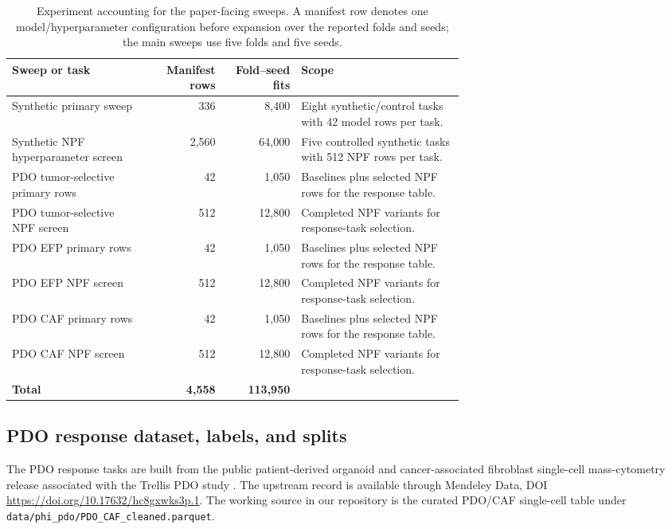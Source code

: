 \documentclass{article}
\theoremstyle{remark}
\theoremstyle{plain}
\begin{document}
\begin{table}[H]
\caption{Experiment accounting for the paper-facing sweeps. A manifest row denotes one model/hyperparameter configuration before expansion over the reported folds and seeds; the main sweeps use five folds and five seeds.}
\label{tab:experiment-accounting}
\centering
\small
\setlength{\tabcolsep}{4pt}
\renewcommand{\arraystretch}{1.12}
\begin{tabular}{p{0.30\linewidth}rrp{0.36\linewidth}}
\toprule
Sweep or task & Manifest rows & Fold--seed fits & Scope \\
\midrule
Synthetic primary sweep & 336 & 8{,}400 & Eight synthetic/control tasks with 42 model rows per task. \\
Synthetic NPF hyperparameter screen & 2{,}560 & 64{,}000 & Five controlled synthetic tasks with 512 NPF rows per task. \\
PDO tumor-selective primary rows & 42 & 1{,}050 & Baselines plus selected NPF rows for the response table. \\
PDO tumor-selective NPF screen & 512 & 12{,}800 & Completed NPF variants for response-task selection. \\
PDO EFP primary rows & 42 & 1{,}050 & Baselines plus selected NPF rows for the response table. \\
PDO EFP NPF screen & 512 & 12{,}800 & Completed NPF variants for response-task selection. \\
PDO CAF primary rows & 42 & 1{,}050 & Baselines plus selected NPF rows for the response table. \\
PDO CAF NPF screen & 512 & 12{,}800 & Completed NPF variants for response-task selection. \\
\midrule
\textbf{Total} & \textbf{4{,}558} & \textbf{113{,}950} & \\
\bottomrule
\end{tabular}
\end{table}


\subsection{PDO response dataset, labels, and splits}
\label{subsec:pdo-response-data-construction}

The PDO response tasks are built from the public patient-derived organoid and cancer-associated fibroblast single-cell mass-cytometry\citep{bendall2011masscytometry, nowicka2017cytof} release associated with the Trellis PDO study \citep{RamosZapatero2023,mendeley2022pdo}. The upstream record is available through Mendeley Data, DOI \url{https://doi.org/10.17632/hc8gxwks3p.1}. The working source in our repository is the curated PDO/CAF single-cell table under \texttt{data/phi\_pdo/PDO\_CAF\_cleaned.parquet}. 
\end{document}
